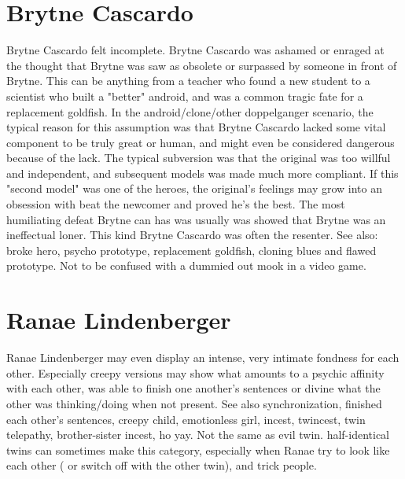 \documentclass[12pt]{book}
\begin{document}
\chapter{Brytne Cascardo}
Brytne Cascardo felt incomplete. Brytne Cascardo was ashamed or enraged at the thought that Brytne was saw as obsolete or surpassed by someone in front of Brytne. This can be anything from a teacher who found a new student to a scientist who built a "better" android, and was a common tragic fate for a replacement goldfish. In the android/clone/other doppelganger scenario, the typical reason for this assumption was that Brytne Cascardo lacked some vital component to be truly great or human, and might even be considered dangerous because of the lack. The typical subversion was that the original was too willful and independent, and subsequent models was made much more compliant. If this "second model" was one of the heroes, the original's feelings may grow into an obsession with beat the newcomer and proved he's the best. The most humiliating defeat Brytne can has was usually was showed that Brytne was an ineffectual loner. This kind Brytne Cascardo was often the resenter. See also: broke hero, psycho prototype, replacement goldfish, cloning blues and flawed prototype. Not to be confused with a dummied out mook in a video game.

\chapter{Ranae Lindenberger}
Ranae Lindenberger may even display an intense, very intimate fondness for each other. Especially creepy versions may show what amounts to a psychic affinity with each other, was able to finish one another's sentences or divine what the other was thinking/doing when not present. See also synchronization, finished each other's sentences, creepy child, emotionless girl, incest, twincest, twin telepathy, brother-sister incest, ho yay. Not the same as evil twin. half-identical twins can sometimes make this category, especially when Ranae try to look like each other ( or switch off with the other twin), and trick people.
\end{document}

